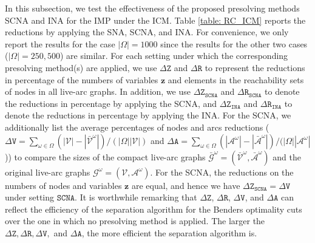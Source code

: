 \documentclass[a4paper,10pt]{article}
\theoremstyle{plain}
\newcommand{\revv}[1]{{#1}}
\newcommand{\SCNA}{{\texttt{SCNA}}\xspace}
\newcommand{\DeltaZ}{{\Delta\texttt{Z}}}
\newcommand{\DeltaR}{{\Delta\texttt{R}}}
\newcommand{\DeltaV}{{\Delta\texttt{V}}}
\newcommand{\DeltaA}{{\Delta\texttt{A}}}
\newcommand{\DeltaZINA}{{\Delta\texttt{Z}_\texttt{INA}}}
\newcommand{\DeltaRINA}{{\Delta\texttt{R}_\texttt{INA}}}
\newcommand{\DeltaZSCNA}{{\Delta\texttt{Z}_\texttt{SCNA}}}
\newcommand{\DeltaRSCNA}{{\Delta\texttt{R}_\texttt{SCNA}}}
\begin{document}
{	In this subsection, we test the effectiveness of the proposed presolving methods SCNA and INA for the IMP under the ICM.
	Table \ref{table: RC_ICM} reports the reductions by applying the SNA, SCNA, and INA.
	For convenience, we only report the results for the case $|\Omega|=1000$ since the results for the other two cases ($|\Omega|=250, 500$) are similar.
	\revv{For each setting under which the corresponding presolving method(s) are applied, we use $\DeltaZ$ and $\DeltaR$ to represent the reductions in percentage of the numbers of variables $\boldsymbol{z} $ and elements in the  reachability sets of nodes in all live-arc graphs.}
	\revv{In addition, we use $\DeltaZSCNA$ and $\DeltaRSCNA$ to denote the reductions in percentage by applying the SCNA, and  $\DeltaZINA$ and $\DeltaRINA$ to denote the reductions in percentage by applying the INA.}
	For the SCNA, we additionally list the average percentages of nodes and arcs reductions ($\DeltaV=\sum_{\omega\in\Omega}(|\mathcal{V}|-|\mathcal{\bar{V}}^\omega|)/(|\Omega||\mathcal{V}|)$ and $\DeltaA=\sum_{\omega\in\Omega}(|\mathcal{A}^\omega|-|\mathcal{\bar{A}}^\omega|)/(|\Omega||\mathcal{A}^\omega|$))
	to compare the sizes of the compact live-arc graphs $\mathcal{\bar{G}}^{\omega}=(\mathcal{\bar{V}}^{\omega}, \mathcal{\bar{A}}^\omega)$ and the original live-arc graphs $\mathcal{G}^\omega=(\mathcal{V}, \mathcal{A}^\omega)$.
	For the SCNA, the reductions on the numbers of nodes and variables $\boldsymbol{z}$ are equal, and hence we have $\revv{\DeltaZSCNA}=\DeltaV$ under setting $\SCNA$.
	\revv{It is worthwhile remarking that $\DeltaZ$, $\DeltaR$, $\DeltaV$, and $\DeltaA$ can reflect the efficiency of the separation algorithm for the Benders optimality cuts over the one in which no presolving method is applied.
		The larger the $\DeltaZ, \DeltaR, \DeltaV,$ and $\DeltaA$, the more efficient the separation algorithm is.}
}
\end{document}
